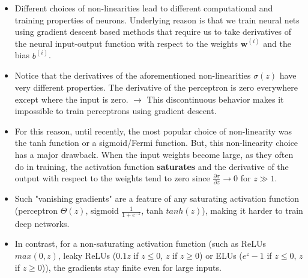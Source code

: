 \documentclass[norsk,a4paper,11pt]{article}
\begin{document}
\begin{itemize}
	\item Different choices of non-linearities lead to different computational and training properties of neurons. Underlying reason is that we train neural nets using gradient descent based methods that require us to take derivatives of the neural input-output function with respect to the weights $\bm{w}^{(i)}$ and the bias $b^{(i)}$. 
	\item Notice that the derivatives of the aforementioned non-linearities $\sigma(z)$ have very different properties. The derivative of the perceptron is zero everywhere except where the input is zero. $\rightarrow$ This discontinuous behavior makes it impossible to train perceptrons using gradient descent. 
	\item For this reason, until recently, the most popular choice of non-linearity was the tanh function or a sigmoid/Fermi function. But, this non-linearity choice has a major drawback. When the input weights become large, as they often do in training, the activation function \textbf{saturates} and the derivative of the output with respect to the weights tend to zero since $\frac{\partial \sigma}{\partial z} \rightarrow 0$ for $z \gg 1$.
	\item Such "vanishing gradients" are a feature of any saturating activation function (perceptron $\Theta (z)$, sigmoid $\frac{1}{1 + e^{-z}}$, tanh $tanh(z)$), making it harder to train deep networks.
	\item In contrast, for a non-saturating activation function (such as ReLUs $max(0, z)$, leaky ReLUs ($0.1z$ if $z\leq 0$, $z$ if $z\geq 0$) or ELUs ($e^z - 1$ if $z\leq 0$, $z$ if $z\geq 0$)), the gradients stay finite even for large inputs.
\end{itemize}
\end{document}
